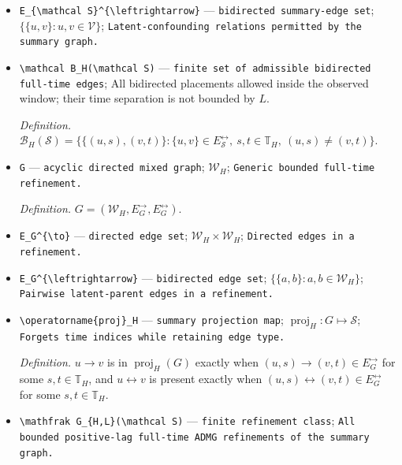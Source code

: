 \documentclass{article}
\begin{document}
\begin{itemize}
  \item \texttt{E\_\allowbreak{}\{\textbackslash{}\allowbreak{}mathcal S\}\allowbreak{}\textasciicircum{}\{\textbackslash{}\allowbreak{}leftrightarrow\}\allowbreak{}} --- \texttt{bidirected summary-\allowbreak{}edge set}; \(\{\{u,v\}:u,v\in\mathcal V\}\); \texttt{Latent-\allowbreak{}confounding relations permitted by the summary graph.}
  \item \texttt{\textbackslash{}\allowbreak{}mathcal B\_\allowbreak{}H(\textbackslash{}\allowbreak{}mathcal S)} --- \texttt{finite set of admissible bidirected full-\allowbreak{}time edges}; All bidirected placements allowed inside the observed window; their time separation is not bounded by \(L\).
  \par\smallskip\noindent\emph{Definition.} \(\mathcal B_H(\mathcal S)=\{\{(u,s),(v,t)\}:\{u,v\}\in E_{\mathcal S}^{\leftrightarrow},\ s,t\in\mathbb T_H,\ (u,s)\ne(v,t)\}\).
  \item \texttt{G} --- \texttt{acyclic directed mixed graph}; \(\mathcal W_H\); \texttt{Generic bounded full-\allowbreak{}time refinement.}
  \par\smallskip\noindent\emph{Definition.} \(G=(\mathcal W_H,E_G^{\to},E_G^{\leftrightarrow})\).
  \item \texttt{E\_\allowbreak{}G\textasciicircum{}\{\textbackslash{}\allowbreak{}to\}\allowbreak{}} --- \texttt{directed edge set}; \(\mathcal W_H\times\mathcal W_H\); \texttt{Directed edges in a refinement.}
  \item \texttt{E\_\allowbreak{}G\textasciicircum{}\{\textbackslash{}\allowbreak{}leftrightarrow\}\allowbreak{}} --- \texttt{bidirected edge set}; \(\{\{a,b\}:a,b\in\mathcal W_H\}\); \texttt{Pairwise latent-\allowbreak{}parent edges in a refinement.}
  \item \texttt{\textbackslash{}\allowbreak{}operatorname\{proj\}\allowbreak{}\_\allowbreak{}H} --- \texttt{summary projection map}; \(\operatorname{proj}_H:G\mapsto\mathcal S\); \texttt{Forgets time indices while retaining edge type.}
  \par\smallskip\noindent\emph{Definition.} \(u\to v\) is in \(\operatorname{proj}_H(G)\) exactly when \((u,s)\to(v,t)\in E_G^{\to}\) for some \(s,t\in\mathbb T_H\), and \(u\leftrightarrow v\) is present exactly when \((u,s)\leftrightarrow(v,t)\in E_G^{\leftrightarrow}\) for some \(s,t\in\mathbb T_H\).
  \item \texttt{\textbackslash{}\allowbreak{}mathfrak G\_\allowbreak{}\{H,\allowbreak{}L\}\allowbreak{}(\textbackslash{}\allowbreak{}mathcal S)} --- \texttt{finite refinement class}; \texttt{All bounded positive-\allowbreak{}lag full-\allowbreak{}time ADMG refinements of the summary graph.}

\end{itemize}
\end{document}
